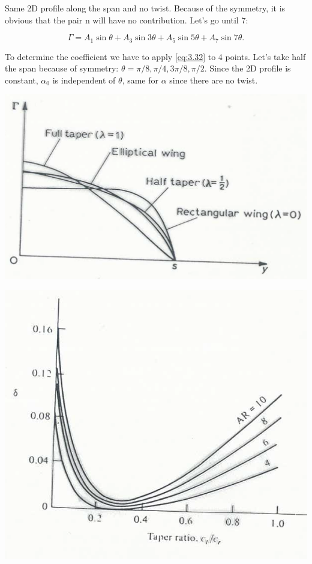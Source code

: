 	Same 2D profile along the span and no twist. Because of the symmetry, it is obvious that the pair n will have no contribution. Let's go until 7:
	
	\begin{equation}
	\Gamma = A_1\sin \theta + A_3\sin 3\theta + A_5\sin 5\theta + A_7\sin 7\theta.
	\end{equation}
	
	To determine the coefficient we have to apply \eqref{eq:3.32} to 4 points. Let's take half the span because of symmetry: $\theta = \pi /8, \pi /4, 3\pi /8, \pi /2$. Since the 2D profile is constant, $\alpha _0$ is independent of $\theta$, same for $\alpha$ since there are no twist. 
	
	\begin{center}
	\begin{minipage}{0.4\textwidth}
	\includegraphics[scale=0.25]{ch3/23}
	\label{fig:3.23}
	\end{minipage}
	\begin{minipage}{0.22\textwidth}
	\includegraphics[scale=0.22]{ch3/24}
	\label{fig:3.24}
	\end{minipage}
	\end{center}
	
